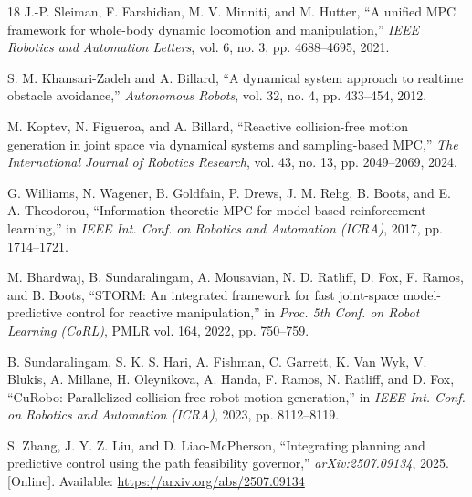 \begin{thebibliography}{18}
J.-P. Sleiman, F. Farshidian, M. V. Minniti, and M. Hutter, ``A unified MPC framework for whole-body dynamic locomotion and manipulation,'' \emph{IEEE Robotics and Automation Letters}, vol. 6, no. 3, pp. 4688--4695, 2021.

S. M. Khansari-Zadeh and A. Billard, ``A dynamical system approach to realtime obstacle avoidance,'' \emph{Autonomous Robots}, vol. 32, no. 4, pp. 433--454, 2012.

M. Koptev, N. Figueroa, and A. Billard, ``Reactive collision-free motion generation in joint space via dynamical systems and sampling-based MPC,'' \emph{The International Journal of Robotics Research}, vol. 43, no. 13, pp. 2049--2069, 2024.

G. Williams, N. Wagener, B. Goldfain, P. Drews, J. M. Rehg, B. Boots, and E. A. Theodorou, ``Information-theoretic MPC for model-based reinforcement learning,'' in \emph{IEEE Int. Conf. on Robotics and Automation (ICRA)}, 2017, pp. 1714--1721.

M. Bhardwaj, B. Sundaralingam, A. Mousavian, N. D. Ratliff, D. Fox, F. Ramos, and B. Boots, ``STORM: An integrated framework for fast joint-space model-predictive control for reactive manipulation,'' in \emph{Proc. 5th Conf. on Robot Learning (CoRL)}, PMLR vol. 164, 2022, pp. 750--759.

B. Sundaralingam, S. K. S. Hari, A. Fishman, C. Garrett, K. Van Wyk, V. Blukis, A. Millane, H. Oleynikova, A. Handa, F. Ramos, N. Ratliff, and D. Fox, ``CuRobo: Parallelized collision-free robot motion generation,'' in \emph{IEEE Int. Conf. on Robotics and Automation (ICRA)}, 2023, pp. 8112--8119.

S. Zhang, J. Y. Z. Liu, and D. Liao-McPherson, ``Integrating planning and predictive control using the path feasibility governor,'' \emph{arXiv:2507.09134}, 2025. [Online]. Available: \url{https://arxiv.org/abs/2507.09134}

\end{thebibliography}
